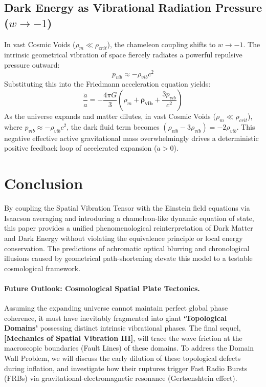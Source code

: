 \documentclass[reprint,amsmath,amssymb,aps,prd]{revtex4-2}
\begin{document}
\subsection{Dark Energy as Vibrational Radiation Pressure ($w \to -1$)}
In vast Cosmic Voids ($\rho_m \ll \rho_{crit}$), the chameleon coupling shifts to $w \to -1$. The intrinsic geometrical vibration of space fiercely radiates a powerful repulsive pressure outward:
\begin{equation}
p_{vib} \approx -\rho_{vib} c^2
\end{equation}
Substituting this into the Friedmann acceleration equation yields:
\begin{equation}
\frac{\ddot{a}}{a} = -\frac{4\pi G}{3} \left( \rho_m + \mathbf{\rho_{vib}} + \frac{3p_{vib}}{c^2} \right)
\end{equation}
As the universe expands and matter dilutes, in vast Cosmic Voids ($\rho_m \ll \rho_{crit}$), where $p_{vib} \approx -\rho_{vib} c^2$, the dark fluid term becomes $(\rho_{vib} - 3\rho_{vib}) = -2\rho_{vib}$. This negative effective active gravitational mass overwhelmingly drives a deterministic positive feedback loop of accelerated expansion ($\ddot{a}>0$).

\section{Conclusion}
By coupling the Spatial Vibration Tensor with the Einstein field equations via Isaacson averaging and introducing a chameleon-like dynamic equation of state, this paper provides a unified phenomenological reinterpretation of Dark Matter and Dark Energy without violating the equivalence principle or local energy conservation. The predictions of achromatic optical blurring and chronological illusions caused by geometrical path-shortening elevate this model to a testable cosmological framework.

\paragraph{Future Outlook: Cosmological Spatial Plate Tectonics.}
Assuming the expanding universe cannot maintain perfect global phase coherence, it must have inevitably fragmented into giant \textbf{`Topological Domains'} possessing distinct intrinsic vibrational phases. The final sequel, \textbf{[Mechanics of Spatial Vibration III]}, will trace the wave friction at the macroscopic boundaries (Fault Lines) of these domains. To address the Domain Wall Problem, we will discuss the early dilution of these topological defects during inflation, and investigate how their ruptures trigger Fast Radio Bursts (FRBs) via gravitational-electromagnetic resonance (Gertsenshtein effect).
\end{document}
